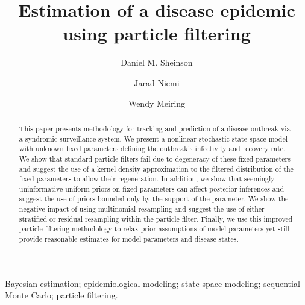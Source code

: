 \documentclass{elsarticle}
\begin{document}
\begin{frontmatter}

\title{Estimation of a disease epidemic using particle filtering}

\author[danny]{Daniel M. Sheinson}
\author[jarad]{Jarad Niemi}
\author[wendy]{Wendy Meiring}

\address[danny]{Corresponding author -- Department of Statistics and Applied Probability, University of Califonia--Santa Barbara, \\
 Santa Barbara, CA, U.S.A., sheinson@pstat.ucsb.edu, 1-847-609-7824}
 \address[jarad]{Department of Statistics, Iowa State University, Ames, IA, U.S.A., niemi@iastate.edu}
 \address[wendy]{Department of Statistics and Applied Probability, University of Califonia--Santa Barbara, \\
 Santa Barbara, CA, U.S.A., meiring@pstat.ucsb.edu}

\begin{abstract}
This paper presents methodology for tracking and prediction of a disease outbreak via a syndromic surveillance system. We present a nonlinear stochastic state-space model with unknown fixed parameters defining the outbreak's infectivity and recovery rate. We show that standard particle filters fail due to degeneracy of these fixed parameters and suggest the use of a kernel density approximation to the filtered distribution of the fixed parameters to allow their regeneration. In addition, we show that seemingly uninformative uniform priors on fixed parameters can affect posterior inferences and suggest the use of priors bounded only by the support of the parameter. We show the negative impact of using multinomial resampling and suggest the use of either stratified or residual resampling within the particle filter. Finally, we use this improved particle filtering methodology to relax prior assumptions of model parameters yet still provide reasonable estimates for model parameters and disease states.
\end{abstract}


\begin{keyword}
Bayesian estimation; epidemiological modeling; state-space modeling; sequential Monte Carlo; particle filtering.
\end{keyword}

\end{frontmatter}

\let\thefootnote\relax{}
\end{document}
